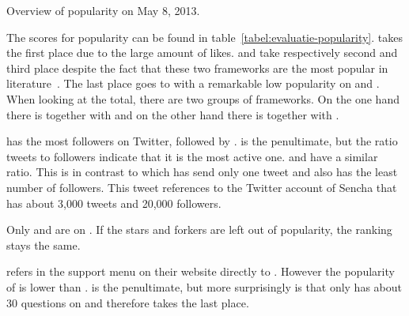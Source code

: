 \documentclass[a4paper]{artikel3}
\begin{document}
\begin{table}[t]
\centering
\resizebox{\columnwidth}{!} {
}
\caption{Overview of popularity on May 8, 2013.}
\label{tabel:evaluatie-popularity}
\end{table}

The scores for popularity can be found in table~\ref{tabel:evaluatie-popularity}. 
\kendoa{} takes the first place due to the large amount of \fb{} likes.
\jqma{} and \sta{} take respectively second and third place despite the fact that these two frameworks are the most popular in literature~\cite{David2011,Firtman2013,Hales2012,Oeflman2011}. 
The last place goes to \lungo{} with a remarkable low popularity on \so{} and \fb.
When looking at the total, there are two groups of frameworks.
On the one hand there is \kendoa{} together with \jqma{} and on the other hand there is \sta{} together with \lungo{}.

\jqma{} has the most followers on Twitter, followed by \kendoa.
\lungo{} is the penultimate, but the ratio tweets to followers indicate that it is the most active one. 
\jqma{} and \kendoa{} have a similar ratio.
This is in contrast to \sta{} which has send only one tweet and also has the least number of followers. 
This tweet references to the Twitter account of Sencha that has about 3,000 tweets and 20,000 followers.

Only \jqma{} and \lungo{} are on \gh{}. 
If the \gh{} stars and \gh{} forkers are left out of popularity, the ranking stays the same.

\kendoa{} refers in the support menu on their website directly to \so{}. 
However the popularity of \kendoa{} is lower than \jqma{}.
\sta{} is the penultimate, but more surprisingly is that \lungo{} only has about 30 questions on \so{} and therefore takes the last place.
\end{document}
